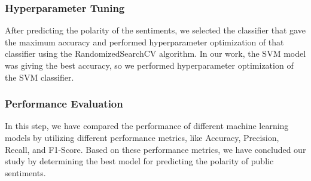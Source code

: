\documentclass[conference]{IEEEtran}
\begin{document}

\vspace{0.3cm}
\subsubsection{Hyperparameter Tuning}
After predicting the polarity of the sentiments, we selected the classifier that gave the maximum accuracy and performed hyperparameter optimization of that classifier using the RandomizedSearchCV algorithm. In our work, the SVM model was giving the best accuracy, so we performed hyperparameter optimization of the SVM classifier.

\vspace{0.3cm}
\subsubsection{Performance Evaluation}
In this step, we have compared the performance of different machine learning models by utilizing different performance metrics, like Accuracy, Precision, Recall, and F1-Score. Based on these performance metrics, we have concluded our study by determining the best model for predicting the polarity of public sentiments. 
\end{document}
